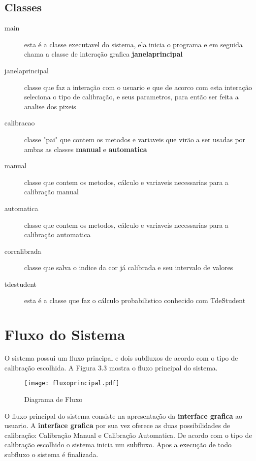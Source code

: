 \subsection{Classes}
	\begin{description}

	\item [main] esta é a classe executavel do sistema, ela inicia o programa e em seguida chama a classe de interação grafica \textbf{janelaprincipal}  
	
	\item [janelaprincipal]	classe que faz a interação com o usuario e que de acorco com esta interação seleciona o tipo de calibração, e seus parametros, para então ser feita a analise dos pixeis	
		
	\item [calibracao] classe "pai" que contem os metodos e variaveis que virão a ser usadas por ambas as classes \textbf{manual} e \textbf{automatica}
	
	\item [manual] classe que contem os metodos, cálculo e variaveis necessarias para a calibração manual
	
	\item [automatica] classe que contem os metodos, cálculo e variaveis necessarias para a calibração automatica
			
	\item [corcalibrada] classe que salva o indice da cor já calibrada e seu intervalo de valores
	
	\item [tdestudent] esta é a classe que faz o cálculo probabilistico conhecido com TdeStudent
	

	\end{description}

	

	\section{Fluxo do Sistema}
O sistema possui um fluxo principal e dois subfluxos de acordo com o tipo de calibração escolhida. A Figura 3.3 mostra o fluxo principal do sistema.
		\begin{figure}[!h]
			\centering
			\texttt{[image: fluxoprincipal.pdf]}
			\caption{Diagrama de Fluxo}
			\label{FlowCHart}
		\end{figure} 
		
		 O fluxo principal do sistema consiste na apresentação da \textbf{interface grafica} ao usuario. A \textbf{interface grafica} por sua vez oferece as duas possibilidades de calibração: Calibração Manual e Calibração Automatica. De acordo com o tipo de calibração escolhido o sistema inicia um subfluxo. Apos a execução de todo subfluxo o sistema é finalizada.
			
